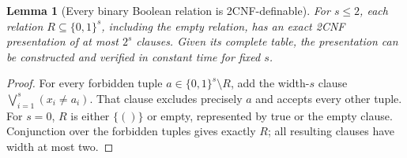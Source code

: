 \documentclass[11pt]{article}
\newtheorem{lemma}[theorem]{Lemma}
\begin{document}
\begin{lemma}[Every binary Boolean relation is 2CNF-definable]\label{lem:binary}
For $s\le2$, each relation $R\subseteq\{0,1\}^s$, including the empty relation, has an exact 2CNF presentation of at most $2^s$ clauses.  Given its complete table, the presentation can be constructed and verified in constant time for fixed $s$.
\end{lemma}
\begin{proof}
For every forbidden tuple $a\in\{0,1\}^s\setminus R$, add the width-$s$ clause $\bigvee_{i=1}^s(x_i\ne a_i)$.  That clause excludes precisely $a$ and accepts every other tuple.  For $s=0$, $R$ is either $\{()\}$ or empty, represented by true or the empty clause.  Conjunction over the forbidden tuples gives exactly $R$; all resulting clauses have width at most two.
\end{proof}
\end{document}

